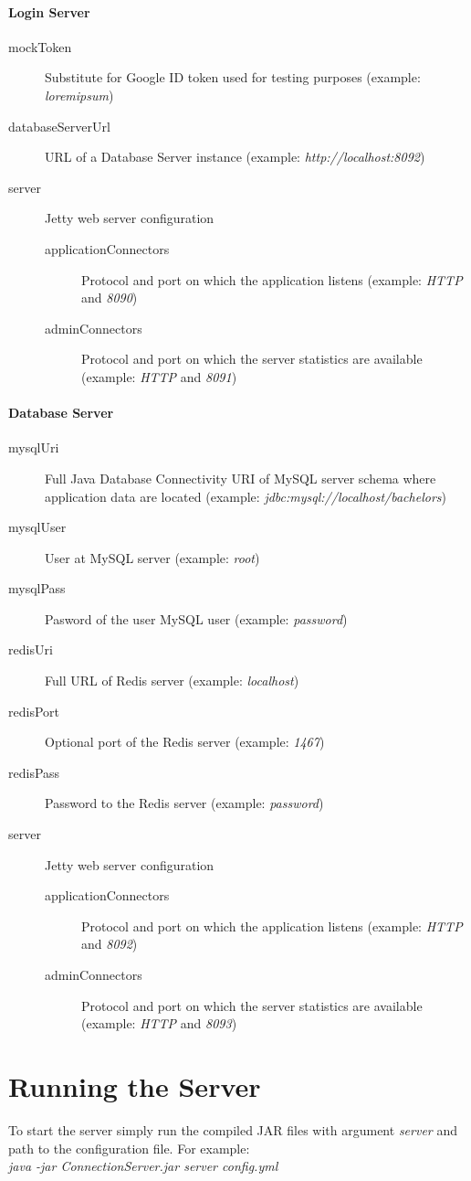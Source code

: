 \paragraph*{Login Server}
\begin{description}
	\item[mockToken] Substitute for Google ID token used for testing purposes (example: \textit{loremipsum})
	\item[databaseServerUrl] URL of a Database Server instance (example: \textit{http://localhost:8092})
	\item[server] Jetty web server configuration
	\begin{description}
		\item[applicationConnectors] Protocol and port on which the application listens (example: \textit{HTTP} and \textit{8090})
		\item[adminConnectors] Protocol and port on which the server statistics are available  (example: \textit{HTTP} and \textit{8091})
	\end{description}
\end{description}

\paragraph*{Database Server}
\begin{description}
	\item[mysqlUri] Full Java Database Connectivity URI of MySQL server schema where application data are located (example: \textit{jdbc:mysql://localhost/bachelors})
	\item[mysqlUser] User at MySQL server (example: \textit{root})
	\item[mysqlPass] Pasword of the user MySQL user (example: \textit{password})
	\item[redisUri] Full URL of Redis server (example: \textit{localhost})
	\item[redisPort] Optional port of the Redis server (example: \textit{1467})
	\item[redisPass] Password to the Redis server (example: \textit{password})
	\item[server] Jetty web server configuration
	\begin{description}
		\item[applicationConnectors] Protocol and port on which the application listens (example: \textit{HTTP} and \textit{8092})
		\item[adminConnectors] Protocol and port on which the server statistics are available  (example: \textit{HTTP} and \textit{8093})
	\end{description}
\end{description}


\section{Running the Server}
To start the server simply run the compiled JAR files with argument \textit{server} and path to the configuration file. For example:\\
\textit{java -jar ConnectionServer.jar server config.yml}

